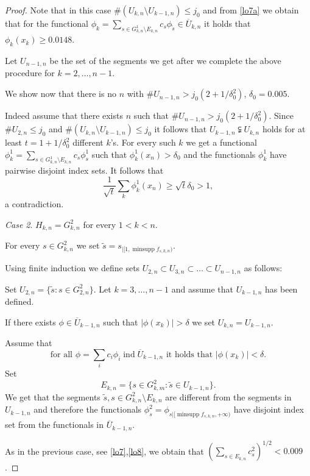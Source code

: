 \documentclass[a4paper]{amsart}
\theoremstyle{plain}
\DeclareMathOperator{\minsupp}{minsupp}
\DeclareMathOperator{\inde}{ind}
\begin{document}
\begin{proof}
Note that in this case  $\#(U_{k,n}\setminus U_{k-1,n})\leq j_0$ and from \eqref{lo7a} we
obtain that for the functional $\phi_{k}=\sum_{s\in G_{k,n}^{1}\setminus
E_{k,n}}c_{s}\phi_{\tilde{s}}\in \overline{U}_{k,n}$ it holds that $\phi_{k}(x_{k})\geq
0.0148$.


Let $U_{n-1,n}$ be the set of the segments we get after we complete the above procedure  for $k=2,\dots,n-1$.



We show now that there is no   $n$ with $\# U_{n-1,n}>j_{0}(2+1/\delta_0^2)$,
$\delta_0=0.005$.


Indeed assume that there exists $n$ such that $\#
U_{n-1,n}>j_{0}(2+1/\delta_0^2)$. Since $\# U_{2,n}\leq j_{0}$ and
$\# (U_{k,n}\setminus U_{k-1,n})\leq j_0$ it follows that $U_{k-1,n}\subsetneqq U_{k,n}$ holds for at
least $t=1+1/\delta_0^2$ different  $k$'s. For every such $k$ we get  a
functional $\phi^1_{k}=\sum_{s\in G_{k,n}^{1}\setminus
E_{k,n}}c_{s}\phi^{1}_{s}$ such that $\phi^1_{k}(x_{n})>\delta_0$
and the  functionals $\phi^1_{k}$ have pairwise disjoint index sets.
It follows that
$$
\frac{1}{\sqrt{t}}\sum_{k}\phi^1_{k}(x_n)\geq \sqrt{t}\delta_0>1,
$$
a contradiction.


\medskip
\textit{Case 2}.  $H_{k,n}=G_{k,n}^{2}$ for every $1<k<n$.

For every $s\in G_{k,n}^{2}$ we set $\tilde{s}=s_{|[1,\minsupp f_{s,k,n})}$.

Using finite induction we define sets  $U_{2,n}\subset U_{3,n}\subset\dots\subset U_{n-1,n}$ as follows:

Set $U_{2,n}=\{\tilde{s}: s\in G_{2,n}^{2}\}$. Let $k=3,\dots,n-1$
and assume that  $U_{k-1,n}$ has been defined.


If there exists $\phi\in \overline{U}_{k-1,n}$ such that  $\vert \phi(x_{k})\vert>\delta$ we set $U_{k,n}=U_{k-1,n}$.

Assume that
\begin{equation}\label{laq3}\mbox{for all $\phi=\sum_{i}c_{i}\phi_{i}\inde\overline{U}_{k-1,n}$ it holds that $\vert \phi(x_{k})\vert<\delta$.}
\end{equation}
Set
$$
E_{k,n}=\{s\in G_{k,m}^{2}: \tilde{s}\in U_{k-1,n}\}.
$$
We get that the segments $\tilde{s}, s\in G_{k,n}^{2}\setminus E_{k,n}$ are different
from the segments in $U_{k-1,n}$ and therefore the functionals
$\phi_{s}^{2}=\phi_{s|[\minsupp f_{s,k,n},+\infty)}$ have disjoint index set from the
functionals in $\overline{U}_{k-1,n}$.

As in the previous case, see \eqref{lo7},\eqref{lo8}, we obtain that $(\sum_{s\in
E_{k,n}}c_{s}^{2})^{1/2}<0.009$.


\end{proof}
\end{document}
